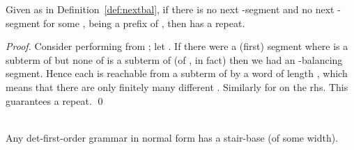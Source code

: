 \documentclass[12pt]{article}
\begin{document}
\begin{prop}
Given   as in Definition~\ref{def:nextbal},
if there is no next -segment and no next -segment for some
,  being a prefix of ,
then  has a repeat.
\end{prop}

\begin{proof}
Consider performing  from ;
let .
If there were a (first) segment  where  is a subterm of  but none of 
 is a subterm of  (of , in
fact) then we had an -balancing segment. Hence each  is
reachable from a subterm of  by a word of length , which
means that there are only finitely many different . Similarly for
 on the rhs. This guarantees a repeat.
\qed
\end{proof}



\begin{prop}~\label{prop:ghasstairbase}\hfill
\\
Any det-first-order grammar  in normal form
has
a stair-base (of some width).
\end{prop}
\end{document}
